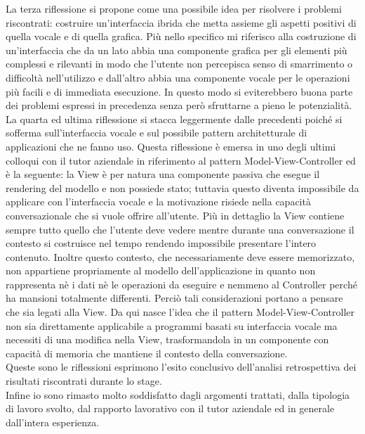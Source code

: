 La terza riflessione si propone come una possibile idea per risolvere i problemi riscontrati: costruire un'interfaccia ibrida che metta assieme gli aspetti positivi di quella vocale e di quella grafica. Più nello specifico mi riferisco alla costruzione di un'interfaccia che da un lato abbia una componente grafica per gli elementi più complessi e rilevanti in modo che l'utente non percepisca senso di smarrimento o difficoltà nell'utilizzo e dall'altro abbia una componente vocale per le operazioni più facili e di immediata esecuzione. In questo modo si eviterebbero buona parte dei problemi espressi in precedenza senza però sfruttarne a pieno le potenzialità. \\
La quarta ed ultima riflessione si stacca leggermente dalle precedenti poiché si sofferma sull'interfaccia vocale e sul possibile pattern architetturale di applicazioni che ne fanno uso. Questa riflessione è emersa in uno degli ultimi colloqui con il tutor aziendale in riferimento al pattern Model-View-Controller ed è la seguente: la View è per natura una componente passiva che esegue il rendering del modello e non possiede stato; tuttavia questo diventa impossibile da applicare con l'interfaccia vocale e la motivazione risiede nella capacità conversazionale che si vuole offrire all'utente. Più in dettaglio la View contiene sempre tutto quello che l'utente deve vedere mentre durante una conversazione il contesto si costruisce nel tempo rendendo impossibile presentare l'intero contenuto. Inoltre questo contesto, che necessariamente deve essere memorizzato, non appartiene propriamente al modello dell'applicazione in quanto non rappresenta nè i dati nè le operazioni da eseguire e nemmeno al Controller perché ha mansioni totalmente differenti. Perciò tali considerazioni portano a pensare che sia legati alla View. Da qui nasce l'idea che il pattern Model-View-Controller non sia direttamente applicabile a programmi basati su interfaccia vocale ma necessiti di una modifica nella View, trasformandola in un componente con capacità di memoria che mantiene il contesto della conversazione. \\
Queste sono le riflessioni esprimono l'esito conclusivo dell'analisi retrospettiva dei risultati riscontrati durante lo stage. \\
Infine io sono rimasto molto soddisfatto dagli argomenti trattati, dalla tipologia di lavoro svolto, dal rapporto lavorativo con il tutor aziendale ed in generale dall'intera esperienza.


